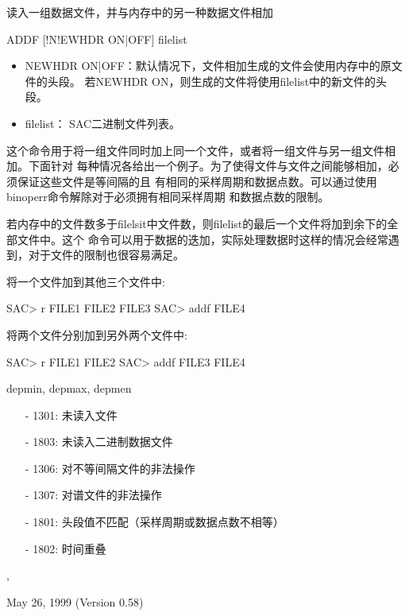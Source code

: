 \label{cmd:addf}

读入一组数据文件，并与内存中的另一种数据文件相加

\begin{SACSTX}
ADDF [!N!EWHDR ON|OFF] filelist
\end{SACSTX}

\begin{itemize}
\item NEWHDR ON|OFF：默认情况下，文件相加生成的文件会使用内存中的原文件的头段。
    若NEWHDR ON，则生成的文件将使用filelist中的新文件的头段。
\item filelist： SAC二进制文件列表。
\end{itemize}

这个命令用于将一组文件同时加上同一个文件，或者将一组文件与另一组文件相加。下面针对
每种情况各给出一个例子。为了使得文件与文件之间能够相加，必须保证这些文件是等间隔的且
有相同的采样周期和数据点数。可以通过使用binoperr命令解除对于必须拥有相同采样周期
和数据点数的限制。

若内存中的文件数多于filelsit中文件数，则filelist的最后一个文件将加到余下的全部文件中。这个
命令可以用于数据的迭加，实际处理数据时这样的情况会经常遇到，对于文件的限制也很容易满足。

将一个文件加到其他三个文件中:
\begin{SACCode}
SAC> r FILE1 FILE2 FILE3
SAC> addf FILE4
\end{SACCode}

将两个文件分别加到另外两个文件中:
\begin{SACCode}
SAC> r FILE1 FILE2
SAC> addf FILE3 FILE4
\end{SACCode}

depmin, depmax, depmen

\begin{itemize}
\item[-]1301: 未读入文件
\item[-]1803: 未读入二进制数据文件
\item[-]1306: 对不等间隔文件的非法操作
\item[-]1307: 对谱文件的非法操作
\item[-]1801: 头段值不匹配（采样周期或数据点数不相等）
\end{itemize}

\begin{itemize}
\item[-]1802: 时间重叠
\end{itemize}

, 

May 26, 1999 (Version 0.58)
